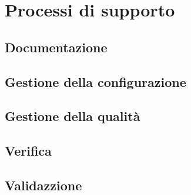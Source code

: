 \section{Processi di supporto}\label{section:processi_supporto}
\subsection{Documentazione}

\subsection{Gestione della configurazione}

\subsection{Gestione della qualità}

\subsection{Verifica}

\subsection{Validazzione}




